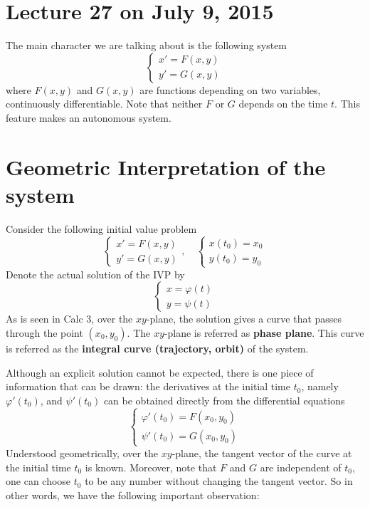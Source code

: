 \documentclass[11pt]{article}
\begin{document}
\newpage
\section{Lecture 27 on July 9, 2015}
The main character we are talking about is the following system
$$\left\{\begin{array}{l}
x' = F(x,y)\\
y' = G(x,y)
\end{array}\right.$$
where $F(x,y)$ and $G(x,y)$ are functions depending on two variables, continuously differentiable. Note that neither $F$ or $G$ depends on the time $t$. This feature makes an autonomous system. 

\section{Geometric Interpretation of the system}
Consider the following initial value problem 
$$\left\{\begin{array}{l}
x' = F(x,y)\\
y' = G(x,y)
\end{array}\right., \quad \left\{\begin{array}{l}
x(t_0) = x_0\\
y(t_0) = y_0
\end{array}\right.$$
Denote the actual solution of the IVP by 
$$\left\{\begin{array}{l}
x = \varphi(t)\\
y = \psi(t)
\end{array}\right.$$
As is seen in Calc 3, over the $xy$-plane, the solution gives a curve that passes through the point $(x_0, y_0)$. The $xy$-plane is referred as \textbf{phase plane}. This curve is referred as the \textbf{integral curve (trajectory,  orbit)} of the system. 

Although an explicit solution cannot be expected, there is one piece of information that can be drawn: the derivatives at the initial time $t_0$, namely $\varphi'(t_0)$, and $\psi'(t_0)$ can be obtained directly from the differential equations
$$\left\{\begin{array}{l}
\varphi'(t_0) = F(x_0, y_0)\\
\psi'(t_0) = G(x_0,y_0)
\end{array}\right.$$
Understood geometrically, over the $xy$-plane, the tangent vector of the curve at the initial time $t_0$ is known. Moreover, note that $F$ and $G$ are independent of $t_0$, one can choose $t_0$ to be any number without changing the tangent vector. So in other words, we have the following important observation:
\end{document}
